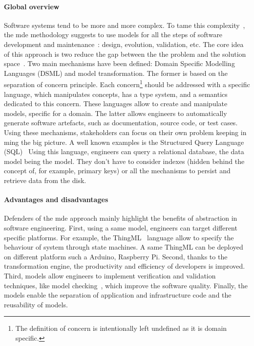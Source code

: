 \paragraph{Global overview}    
Software systems tend to be more and more complex.
To tame this complexity~\cite{DBLP:conf/icse/FranceR07, DBLP:journals/computer/Schmidt06}, the \gls{mde} methodology suggests  to use models for all the steps of software development and maintenance~\cite{DBLP:journals/computer/Schmidt06, DBLP:series/synthesis/2017Brambilla, DBLP:conf/icse/HutchinsonRW11, DBLP:conf/uml/BakerLW05, DBLP:conf/icse/HutchinsonWRK11, DBLP:journals/software/AtkinsonK03a}: design, evolution, validation, etc.
The core idea of this approach is two reduce the gap between the the problem and the solution space~\cite{DBLP:journals/computer/Schmidt06}.
Two main mechanisms have been defined: Domain Specific Modelling Languages (DSML) and model transformation.
The former is based on the separation of concern principle.
Each concern\footnote{The definition of concern is intentionally left undefined as it is domain specific.} should be addressed with a specific language, which manipulates concepts, has a type system, and a semantics dedicated to this concern.
These languages allow to create and manipulate models, specific for a domain.
The latter allows engineers to automatically generate software artefacts, such as documentation, source code, or test cases.
Using these mechanisms, stakeholders can focus on their own problem keeping in ming the big picture.
A well known examples is the Structured Query Language \linebreak (SQL)~\cite{SQL:Spec}
Using this language, engineers can query a relational database, the data model being the model.
They don't have to consider indexes (hidden behind the concept of, for example, primary keys) or all the mechanisms to persist and retrieve data from the disk.

\paragraph{Advantages and disadvantages}
Defenders of the \gls{mde} approach mainly highlight the benefits of abstraction in software engineering\cite{DBLP:journals/computer/Schmidt06, DBLP:conf/ifm/Kent02, DBLP:conf/uml/BakerLW05}.
First, using a same model, engineers can target different specific platforms.
For example, the ThingML~\cite{DBLP:conf/models/HarrandFMH16} language allow to specify the behaviour of system through state machines.
A same ThingML can be deployed on different platform such a Arduino, Raspberry Pi.
Second, thanks to the transformation engine, the productivity and efficiency of developers is improved.
Third, models allow engineers to implement verification and validation techniques, like model checking~\cite{DBLP:books/daglib/0020348}, which improve the software quality.
Finally, the models enable the separation of application and infrastructure code and the reusability of models.


